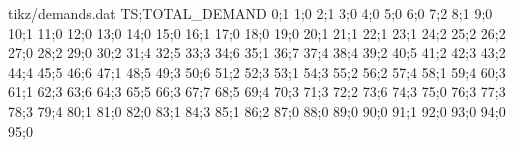 \newcommand{\resp}{{\em resp. }}
\newcommand{\ie}{{\em i.e. }}
\newcommand{\eg}{{\em e.g. }}
\newcommand{\see}{{\em see. }}

\newenvironment{proof}[1][Proof]{\noindent\textbf{#1.} }{\ \rule{0.5em}{0.5em}\bigskip}
\newenvironment{pbDefinition}[1][Definition]{\ \\ \noindent\textbf{[#1]}:}{}

\newtheorem{definition}{Definition}
\newtheorem{case}{Case}
\newtheorem{remark}{Remark}
\newtheorem{theorem}{Theorem}
\newtheorem{lemma}{Lemma}
\newtheorem{corollary}{Corollary}
\newtheorem{prop}{Property}

\begin{filecontents}{tikz/demands.dat}
TS;TOTAL_DEMAND
0;1
1;0
2;1
3;0
4;0
5;0
6;0
7;2
8;1
9;0
10;1
11;0
12;0
13;0
14;0
15;0
16;1
17;0
18;0
19;0
20;1
21;1
22;1
23;1
24;2
25;2
26;2
27;0
28;2
29;0
30;2
31;4
32;5
33;3
34;6
35;1
36;7
37;4
38;4
39;2
40;5
41;2
42;3
43;2
44;4
45;5
46;6
47;1
48;5
49;3
50;6
51;2
52;3
53;1
54;3
55;2
56;2
57;4
58;1
59;4
60;3
61;1
62;3
63;6
64;3
65;5
66;3
67;7
68;5
69;4
70;3
71;3
72;2
73;6
74;3
75;0
76;3
77;3
78;3
79;4
80;1
81;0
82;0
83;1
84;3
85;1
86;2
87;0
88;0
89;0
90;0
91;1
92;0
93;0
94;0
95;0
\end{filecontents}